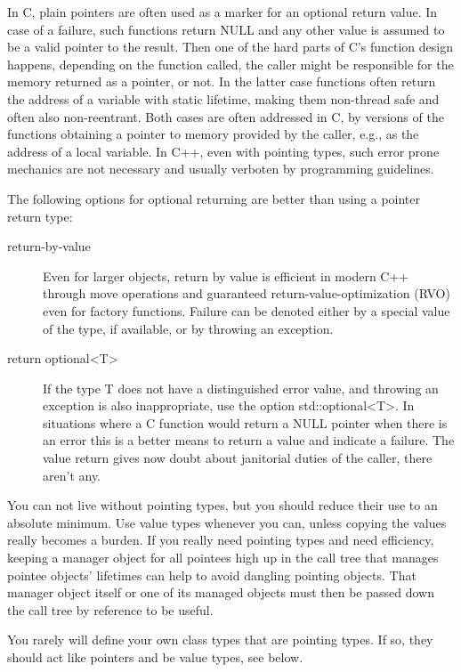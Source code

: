 \documentclass[ebook,11pt,article]{memoir}
\begin{document}
In C, plain pointers are often used as a marker for an optional return value. In case of a failure, such functions return NULL and any other value is assumed to be a valid pointer to the result. Then one of the hard parts of C's function design happens, depending on the function called, the caller might be responsible for the memory returned as a pointer, or not. In the latter case functions often return the address of a variable with static lifetime, making them non-thread safe and often also non-reentrant. Both cases are often addressed in C, by versions of the functions obtaining a pointer to memory provided by the caller, e.g., as the address of a local variable. In C++, even with pointing types, such error prone mechanics are not necessary and usually verboten by programming guidelines. 

The following options for optional returning are better than using a pointer return type:
\begin{description}
\item[return-by-value] Even for larger objects, return by value is efficient in modern C++ through move operations and guaranteed return-value-optimization (RVO) even for factory functions. Failure can be denoted either by a special value of the type, if available, or by throwing an exception.
\item[return optional<T>] If the type T does not have a distinguished error value, and throwing an exception is also inappropriate, use the option std::optional<T>. In situations where a C function would return a NULL pointer when there is an error this is a better means to return a value and indicate a failure. The value return gives now doubt about janitorial duties of the caller, there aren't any.
\end{description}

You can not live without pointing types, but you should reduce their use to an absolute minimum. Use value types whenever you can, unless copying the values really becomes a burden. If you really need pointing types and need efficiency, keeping a manager object for all pointees high up in the call tree that manages pointee objects' lifetimes can help to avoid dangling pointing objects. That manager object itself or one of its managed objects must then be passed down the call tree by reference to be useful.

You rarely will define your own class types that are pointing types. If so, they should act like pointers and be value types, see below. 
\end{document}
